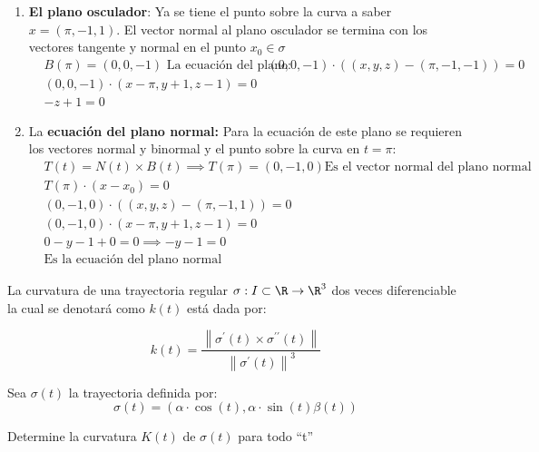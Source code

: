 \begin{enumerate}
	\item \textbf{El plano osculador}:
	      Ya se tiene el punto sobre la curva a saber $x=(\pi,-1,1)$.
	      El vector normal al plano osculador se termina con los vectores tangente y normal en el punto $x_0\in\sigma$
	      \begin{align*}
		       & B(\pi)=(0,0,-1)\text{ La ecuación del plano: }
		       & (0,0,-1)\cdot\left((x,y,z)-(\pi,-1,-1)\right)=0 \\
		       & (0,0,-1)\cdot(x-\pi,y+1,z-1)=0                  \\
		       & -z+1=0
	      \end{align*}
	\item La \textbf{ecuación del plano normal:}
	      Para la ecuación de este plano se requieren los vectores normal y binormal y el punto sobre la curva en $t=\pi$:
	      \begin{align*}
		       & T(t)=N(t)\times B(t)\implies T(\pi)=(0,-1,0) \text{Es el vector normal del plano normal } \\
		       & T(\pi)\cdot(x-x_0)=0                                                                      \\
		       & (0,-1,0)\cdot\left((x,y,z)-(\pi,-1,1)\right)=0                                            \\
		       & (0,-1,0)\cdot (x-\pi,y+1,z-1)=0                                                           \\
		       & 0-y-1+0=0\implies -y-1=0                                                                  \\
		       & \text{Es la ecuación del plano normal}
	      \end{align*}
\end{enumerate}


La curvatura de una trayectoria regular $\sigma:I\subset \R\to \R^3$
dos veces diferenciable la cual se denotará como $k(t)$ está dada por:

\begin{equation}
	k(t)=\frac{\left\lVert \sigma^{\prime} (t)\times \sigma^{\prime\prime}(t)\right\rVert }{\left\lVert \sigma^{\prime} (t)\right\rVert^3}
\end{equation}

\begin{example}
	Sea $\sigma(t)$ la trayectoria definida por:
	\begin{equation*}
		\sigma(t)=\left(\alpha\cdot\cos{(t)},\alpha\cdot\sin{(t)}\beta(t)\right)
	\end{equation*}

	Determine la curvatura $K(t)$ de $\sigma(t)$ para todo ``t''
\end{example}


